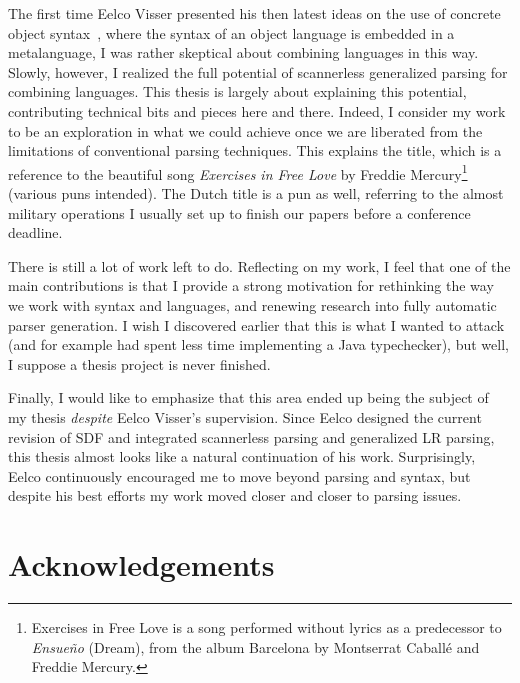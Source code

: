         The first time Eelco Visser presented his then latest ideas on
        the use of concrete object syntax~\cite{Vis02.gpce}, where the
        syntax of an object language is embedded in a metalanguage, I
        was rather skeptical about combining languages in this
        way. Slowly, however, I realized the full potential of
        scannerless generalized parsing for combining languages. This
        thesis is largely about explaining this potential,
        contributing technical bits and pieces here and there. Indeed,
        I consider my work to be an exploration in what we could
        achieve once we are liberated from the limitations of
        conventional parsing techniques. This explains the title,
        which is a reference to the beautiful song \emph{Exercises in
          Free Love} by Freddie Mercury\footnote{Exercises in Free
          Love is a song performed without lyrics as a predecessor to
          \emph{Ensue\~no} (Dream), from the album Barcelona by
          Montserrat Caball\'e and Freddie Mercury.} (various puns
        intended). The Dutch title is a pun as well, referring to the
        almost military operations I usually set up to finish our
        papers before a conference deadline.

        There is still a lot of work left to do. Reflecting on my
        work, I feel that one of the main contributions is that I
        provide a strong motivation for rethinking the way we work
        with syntax and languages, and renewing research into fully
        automatic parser generation.
%
        I wish I discovered earlier that this is what I wanted to
        attack (and for example had spent less time implementing a
        Java typechecker), but well, I suppose a thesis project is
        never finished.

        Finally, I would like to emphasize that this area ended up
        being the subject of my thesis \emph{despite} Eelco Visser's
        supervision. Since Eelco designed the current revision of SDF
        and integrated scannerless parsing and generalized LR parsing,
        this thesis almost looks like a natural continuation of his
        work. Surprisingly, Eelco continuously encouraged me to move
        beyond parsing and syntax, but despite his best efforts my
        work moved closer and closer to parsing issues.

\section*{Acknowledgements}

